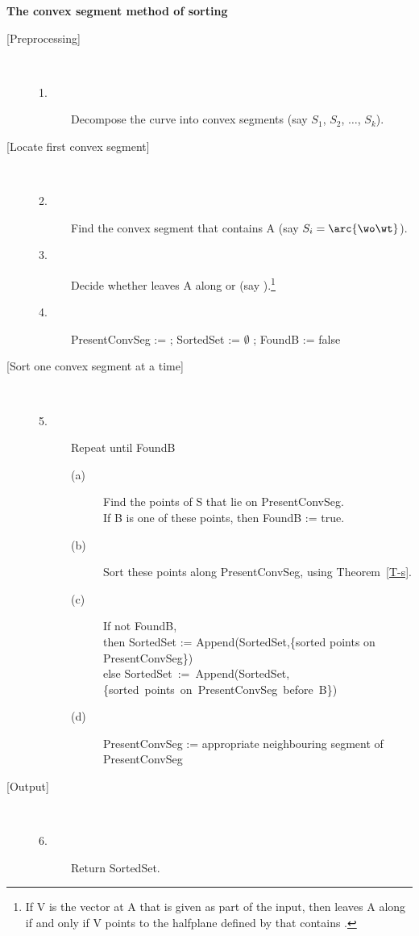 \clearpage

\begin{center}{\bf The convex segment method of sorting}\end{center}
\begin{description}
\item[{[Preprocessing]}] \ \ \ 
\begin{description}
\item[1.] Decompose the curve into convex segments
	(say $S_{1}$, $S_{2}$, $\ldots$, $S_{k}$).
\end{description}
%
\item[{[Locate first convex segment]}] \ \ \ 
\begin{description}
\item[2.]
	Find the convex segment that contains A (say $S_{i} = \arc{\wo\wt}$).
\item[3.]
	Decide whether  leaves A along  or \arc{AW_{2}}
	(say \arc{AW_{1}}).\footnote{If V is the vector at A that is given as 
		part of the input, then \arc{AB} leaves A along \arc{AW_{1}} if 
\label{alg-page}
		and only if V points to the halfplane defined by  
		that contains .}
\item[4.]
	PresentConvSeg :=  ;
	SortedSet := $\emptyset$ ;
	FoundB := false
\end{description}
%
\item[{[Sort one convex segment at a time]}] \ \ \ 
\begin{description}
\item[5.]
	Repeat until FoundB
\begin{description}
\item[(a)]
	Find the points of S that lie on PresentConvSeg.\\
	If B is one of these points, then FoundB := true.
\item[(b)]
	Sort these points along PresentConvSeg, 
	using Theorem~\ref{T-s}.
\item[(c)]
	If not FoundB,\\
	then SortedSet := Append(SortedSet,\{sorted points on PresentConvSeg\})\\
	else \mbox{SortedSet := Append(SortedSet,\{sorted points on PresentConvSeg before B\})}
\item[(d)]
	PresentConvSeg := appropriate neighbouring segment of 
	PresentConvSeg
\end{description}
\end{description}
%
\item[{[Output]}] \ \ \ 
\begin{description}
\item[6.]
	Return SortedSet.
\end{description}
\end{description}

